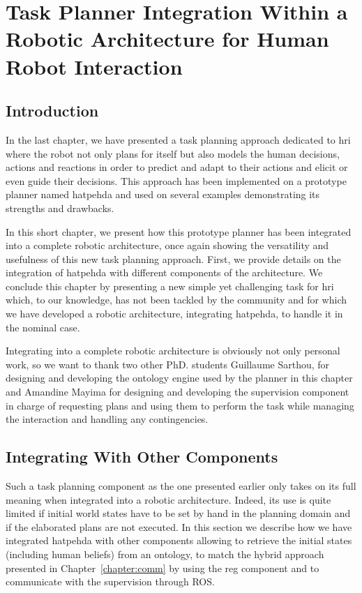 \documentclass[a4paper,11pt,twoside]{StyleThese}
\begin{document}
\setcounter{chapter}{4} %
\dominitoc
\faketableofcontents
\fi

\chapter{Task Planner Integration Within a Robotic Architecture for Human Robot Interaction}
\label{chapter:integration}
\minitoc

\section{Introduction}
In the last chapter, we have presented a task planning approach dedicated to \acrshort{hri} where the robot not only plans for itself but also models the human decisions, actions and reactions in order to predict and adapt to their actions and elicit or even guide their decisions. This approach has been implemented on a prototype planner named \acrfull{hatpehda} and used on several examples demonstrating its strengths and drawbacks.

In this short chapter, we present how this prototype planner has been integrated into a complete robotic architecture, once again showing the versatility and usefulness of this new task planning approach. First, we provide details on the integration of \acrshort{hatpehda} with different components of the architecture. We conclude this chapter by presenting a new simple yet challenging task for \acrlong{hri} which, to our knowledge, has not been tackled by the community and for which we have developed a robotic architecture, integrating \acrshort{hatpehda}, to handle it in the nominal case.

Integrating into a complete robotic architecture is obviously not only personal work, so we want to thank two other PhD. students Guillaume Sarthou, for designing and developing the ontology engine used by the planner in this chapter and Amandine Mayima for designing and developing the supervision component in charge of requesting plans and using them to perform the task while managing the interaction and handling any contingencies.

\section{Integrating With Other Components}
\label{sec:chap5integratingwithothers}

Such a task planning component as the one presented earlier only takes on its full meaning when integrated into a robotic architecture. Indeed, its use is quite limited if initial world states have to be set by hand in the planning domain and if the elaborated plans are not executed. In this section we describe how we have integrated \acrshort{hatpehda} with other components allowing to retrieve the initial states (including human beliefs) from an ontology, to match the hybrid approach presented in Chapter~\ref{chapter:comm} by using the \acrshort{reg} component and to communicate with the supervision through ROS.
\end{document}
